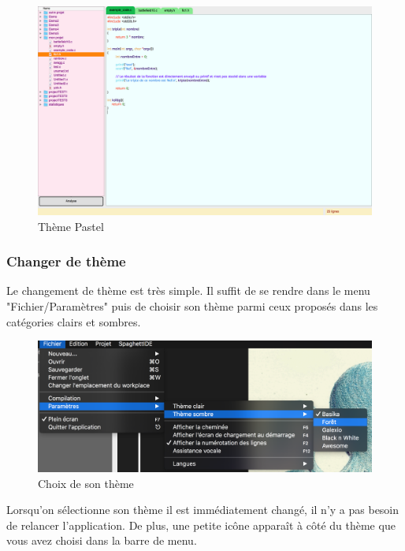 \documentclass[a4paper,12pt]{article}
\begin{document}
		\begin{figure}[h!]
			\begin{center}
				\includegraphics[scale=0.2]{images/imgs_themes/theme_pastel}
				\caption{Thème Pastel}
			\end{center}
		\end{figure}
		
		\newpage
			\subsubsection{Changer de thème}
		
			Le changement de thème est très simple. Il suffit de se rendre dans le menu "Fichier/Paramètres" puis de choisir son thème parmi ceux proposés dans les catégories clairs et sombres.
	
			\begin{figure}[h!]
				\begin{center}
					\includegraphics[scale=0.5]{images/imgs_themes/choix_theme}
					\caption{Choix de son thème}
				\end{center}
			\end{figure}
			
			Lorsqu'on sélectionne son thème il est immédiatement changé, il n'y a pas besoin de relancer l'application. De plus, une petite icône apparaît à côté du thème que vous avez choisi dans la barre de menu.\\
			
\end{document}
